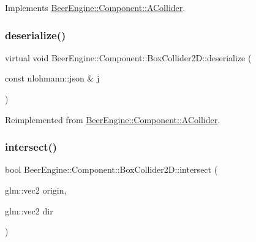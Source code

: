 Implements \mbox{\hyperlink{class_beer_engine_1_1_component_1_1_a_collider_a3d7b4784b8ba49a9d0fe72e8ff00ad1e}{Beer\+Engine\+::\+Component\+::\+A\+Collider}}.

\mbox{\label{class_beer_engine_1_1_component_1_1_box_collider2_d_ab7de4fc1ab97576308f9f5bb76098a54}} 
\subsubsection{\texorpdfstring{deserialize()}{deserialize()}}
{\footnotesize\ttfamily virtual void Beer\+Engine\+::\+Component\+::\+Box\+Collider2\+D\+::deserialize (\begin{DoxyParamCaption}\item[{const nlohmann\+::json \&}]{j }\end{DoxyParamCaption})\hspace{0.3cm}{\ttfamily [virtual]}}



Reimplemented from \mbox{\hyperlink{class_beer_engine_1_1_component_1_1_a_collider_ac6bad21e0cfe7f95c431b9a7a59c550c}{Beer\+Engine\+::\+Component\+::\+A\+Collider}}.

\mbox{\label{class_beer_engine_1_1_component_1_1_box_collider2_d_a6ebe330aba3bb7f8f7a84686b0717e5d}} 
\subsubsection{\texorpdfstring{intersect()}{intersect()}\hspace{0.1cm}{\footnotesize\ttfamily [1/2]}}
{\footnotesize\ttfamily bool Beer\+Engine\+::\+Component\+::\+Box\+Collider2\+D\+::intersect (\begin{DoxyParamCaption}\item[{glm\+::vec2}]{origin,  }\item[{glm\+::vec2}]{dir }\end{DoxyParamCaption})\hspace{0.3cm}{\ttfamily [virtual]}}



